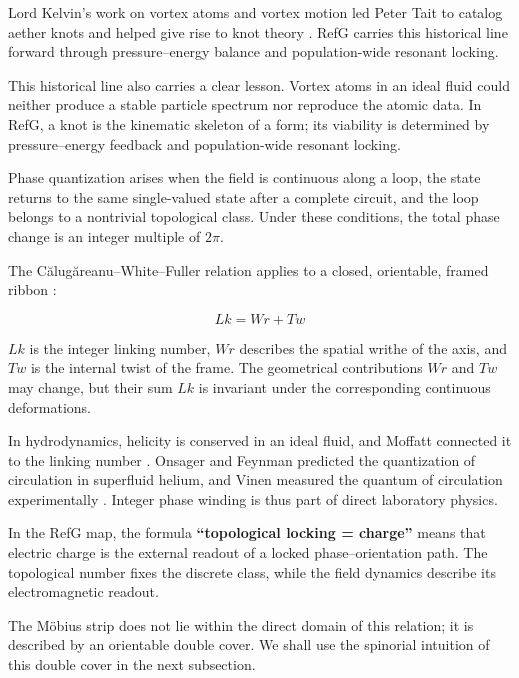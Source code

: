 \documentclass[11pt,a4paper]{article}
\begin{document}
Lord Kelvin's work on vortex atoms and vortex motion \citep{thomson1867,thomson1869} led Peter Tait to catalog aether knots and helped give rise to knot theory \citep{tait1877}. RefG carries this historical line forward through pressure--energy balance and population-wide resonant locking.

This historical line also carries a clear lesson. Vortex atoms in an ideal fluid could neither produce a stable particle spectrum nor reproduce the atomic data. In RefG, a knot is the kinematic skeleton of a form; its viability is determined by pressure--energy feedback and population-wide resonant locking.

Phase quantization arises when the field is continuous along a loop, the state returns to the same single-valued state after a complete circuit, and the loop belongs to a nontrivial topological class. Under these conditions, the total phase change is an integer multiple of $2\pi$.

The Călugăreanu--White--Fuller relation applies to a closed, orientable, framed ribbon \citep{calugareanu1961,white1969,fuller1971,ricca2011}:

\begin{equation}
Lk = Wr + Tw
\label{eq:self-linking}
\end{equation}

$Lk$ is the integer linking number, $Wr$ describes the spatial writhe of the axis, and $Tw$ is the internal twist of the frame. The geometrical contributions $Wr$ and $Tw$ may change, but their sum $Lk$ is invariant under the corresponding continuous deformations.

In hydrodynamics, helicity is conserved in an ideal fluid, and Moffatt connected it to the linking number \citep{moffatt1969}. Onsager and Feynman predicted the quantization of circulation in superfluid helium, and Vinen measured the quantum of circulation experimentally \citep{onsager1949,feynman1955,vinen1961}. Integer phase winding is thus part of direct laboratory physics.

In the RefG map, the formula \textbf{“topological locking = charge”} means that electric charge is the external readout of a locked phase--orientation path. The topological number fixes the discrete class, while the field dynamics describe its electromagnetic readout.

The Möbius strip does not lie within the direct domain of this relation; it is described by an orientable double cover. We shall use the spinorial intuition of this double cover in the next subsection.
\end{document}
